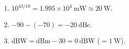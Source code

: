 \begin{enumerate}[leftmargin=1.6em,itemsep=2pt]
\item $10^{43/10} = 1.995\times10^{4}\ \text{mW} \approx 20\ \text{W}$.
\item $-90 - (-70) = -20\ \text{dBc}$.
\item $\text{dBW} = \text{dBm} - 30 = 0\ \text{dBW}$ ($=1\ \text{W}$).
\end{enumerate}
